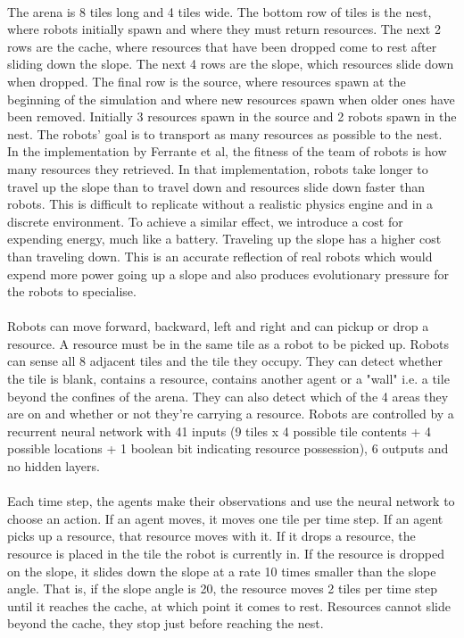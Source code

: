 \documentclass[sigconf]{aamas}  %
\begin{document}
\paragraph{}
The arena is 8 tiles long and 4 tiles wide. The bottom row of tiles is the nest, where robots initially spawn and where they must return resources. The next 2 rows are the cache, where resources that have been dropped come to rest after sliding down the slope. The next 4 rows are the slope, which resources slide down when dropped. The final row is the source, where resources spawn at the beginning of the simulation and where new resources spawn when older ones have been removed. Initially 3 resources spawn in the source and 2 robots spawn in the nest. The robots' goal is to transport as many resources as possible to the nest. In the implementation by Ferrante et al, the fitness of the team of robots is how many resources they retrieved. In that implementation, robots take longer to travel up the slope than to travel down and resources slide down faster than robots. This is difficult to replicate without a realistic physics engine and in a discrete environment. To achieve a similar effect, we introduce a cost for expending energy, much like a battery. Traveling up the slope has a higher cost than traveling down. This is an accurate reflection of real robots which would expend more power going up a slope and also produces evolutionary pressure for the robots to specialise. 

\paragraph{}
Robots can move forward, backward, left and right and can pickup or drop a resource. A resource must be in the same tile as a robot to be picked up. Robots can sense all 8 adjacent tiles and the tile they occupy. They can detect whether the tile is blank, contains a resource, contains another agent or a "wall" i.e. a tile beyond the confines of the arena. They can also detect which of the 4 areas they are on and whether or not they're carrying a resource. Robots are controlled by a recurrent neural network with 41 inputs (9 tiles x 4 possible tile contents + 4 possible locations + 1 boolean bit indicating resource possession), 6 outputs and no hidden layers. 

\paragraph{}
Each time step, the agents make their observations and use the neural network to choose an action. If an agent moves, it moves one tile per time step. If an agent picks up a resource, that resource moves with it. If it drops a resource, the resource is placed in the tile the robot is currently in. If the resource is dropped on the slope, it slides down the slope at a rate 10 times smaller than the slope angle. That is, if the slope angle is 20, the resource moves 2 tiles per time step until it reaches the cache, at which point it comes to rest. Resources cannot slide beyond the cache, they stop just before reaching the nest. 
\end{document}
